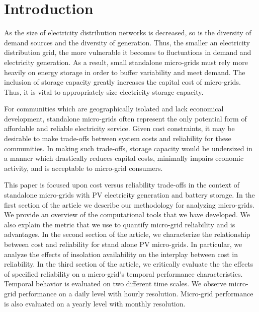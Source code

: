 \documentclass{article}
\begin{document}
\section{Introduction}

As the size of electricity distribution networks is decreased,
so is the diversity of demand sources and 
the diversity of generation.
Thus, the smaller an electricity distribution grid, the more vulnerable 
it becomes to fluctuations in demand and electricity generation.
As a result, small standalone micro-grids must rely more heavily on
energy storage in order to buffer variability and meet demand.  
The inclusion of storage capacity greatly increases the capital cost of micro-grids.
Thus, it is vital to appropriately size electricity storage capacity.

For communities which are geographically isolated and lack economical development, standalone micro-grids often represent the only potential form of affordable and reliable electricity service. 
Given cost constraints, it may be desirable to make trade-offs between system costs and reliability for these communities. 
In making such trade-offs, storage capacity would be undersized in a manner which 
drastically %
reduces capital costs, minimally impairs economic activity, and is acceptable to micro-grid consumers. 

This paper is focused upon cost versus reliability trade-offs in
the context of standalone micro-grids with PV electricity generation
and battery storage. 
In the first section of the article we describe our methodology 
for analyzing micro-grids. 
We provide an overview of the computational tools that we have developed.
We also explain the metric that we use to quantify micro-grid reliability
and is advantages.
In the second section of the article, we characterize the relationship 
between cost and reliability for stand alone PV micro-grids. 
In particular, we analyze the effects of insolation availability on 
the interplay between cost in reliability. 
In the third section of the article, we critically evaluate the 
the effects of specified reliability on a micro-grid's temporal performance 
characteristics. 
Temporal behavior is evaluated on two different time scales. 
We observe micro-grid performance on a daily level with hourly resolution. 
Micro-grid performance is also evaluated on a yearly level 
with monthly resolution. 
\end{document}

